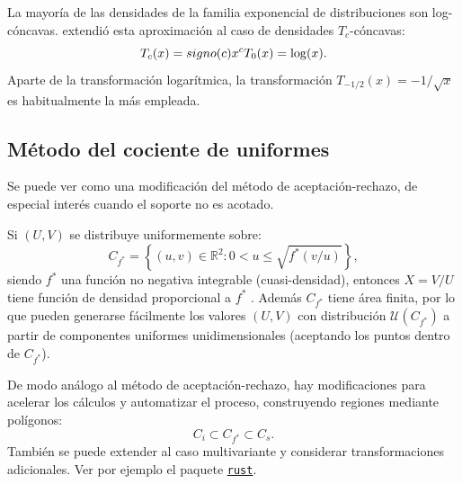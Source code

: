 \documentclass[
  10pt,
]{book}
\theoremstyle{break}
\theoremstyle{nonumberplain}
\begin{document}
La mayoría de las densidades de la familia exponencial de distribuciones son log-cóncavas.
\citet{hormann1995} extendió esta aproximación al caso de densidades \(T_{c}\)-cóncavas:
\[T_{c}(x) = signo(c)x^{c} \\ T_{0}(x) = \log (x).\]
Aparte de la transformación logarítmica, la transformación \(T_{-1/2}(x)=-1/\sqrt{x}\) es habitualmente la más empleada.

\hypertarget{muxe9todo-del-cociente-de-uniformes}{%
\subsection{Método del cociente de uniformes}\label{muxe9todo-del-cociente-de-uniformes}}

Se puede ver como una modificación del método de aceptación-rechazo, de especial interés cuando el soporte no es acotado.

Si \((U,V)\) se distribuye uniformemente sobre:
\[C_{f^{\ast}} = \left\{ (u, v) \in \mathbb{R}^{2} : 
0<u\leq \sqrt{f^{\ast}(v/u)} \right\},\]
siendo \(f^{\ast}\) una función no negativa integrable (cuasi-densidad), entonces \(X=V/U\) tiene función de densidad proporcional a \(f^{\ast}\) \citep{kinderman1977}.
Además \(C_{f^{\ast}}\) tiene área finita, por lo que pueden generarse fácilmente los valores \((U,V)\) con distribución \(\mathcal{U}\left(C_{f^{\ast}}\right)\) a partir de componentes uniformes unidimensionales (aceptando los puntos dentro de \(C_{f^{\ast}}\)).

De modo análogo al método de aceptación-rechazo, hay modificaciones para acelerar los cálculos y automatizar el proceso, construyendo regiones mediante polígonos:
\[C_{i}\subset C_{f^{\ast}}\subset C_{s}.\]
También se puede extender al caso multivariante y considerar transformaciones adicionales.
Ver por ejemplo el paquete \href{https://paulnorthrop.github.io/rust/}{\texttt{rust}}.
\end{document}

